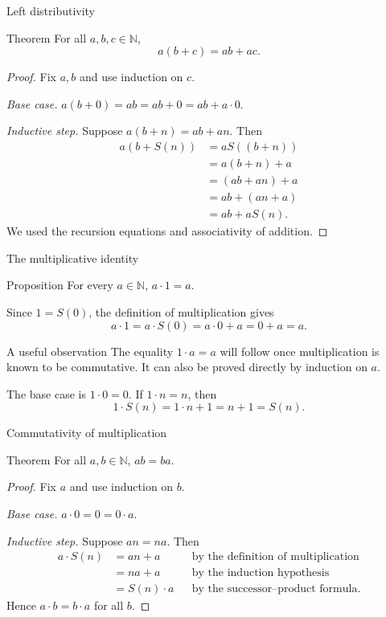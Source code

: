 \documentclass[aspectratio=169,11pt]{beamer}
\newcommand{\N}{\mathbb N}
\newcommand{\suc}[1]{S(#1)}
\begin{document}
\begin{frame}{Left distributivity}
  \footnotesize
  \begin{block}{Theorem}
    For all \(a,b,c\in\N\),
    \[
      a(b+c)=ab+ac.
    \]
  \end{block}

  \begin{proof}
    Fix \(a,b\) and use induction on \(c\).

    \emph{Base case.}
    \(a(b+0)=ab=ab+0=ab+a\cdot0\).

    \emph{Inductive step.} Suppose \(a(b+n)=ab+an\).  Then
    \begin{align*}
      a(b+\suc n)
        &=a\suc{(b+n)}\\
        &=a(b+n)+a\\
        &=(ab+an)+a\\
        &=ab+(an+a)\\
        &=ab+a\suc n.
    \end{align*}
    We used the recursion equations and associativity of addition.
  \end{proof}
\end{frame}

\begin{frame}{The multiplicative identity}
  \begin{block}{Proposition}
    For every \(a\in\N\), \(a\cdot1=a\).
  \end{block}

  Since \(1=\suc 0\), the definition of multiplication gives
  \[
    a\cdot1=a\cdot\suc 0=a\cdot0+a=0+a=a.
  \]

  \begin{block}{A useful observation}
    The equality \(1\cdot a=a\) will follow once multiplication is known to be
    commutative.  It can also be proved directly by induction on \(a\).

    The base case is \(1\cdot0=0\).  If \(1\cdot n=n\), then
    \[
      1\cdot\suc n=1\cdot n+1=n+1=\suc n.
    \]
  \end{block}
\end{frame}

\begin{frame}{Commutativity of multiplication}
  \begin{block}{Theorem}
    For all \(a,b\in\N\), \(ab=ba\).
  \end{block}

  \begin{proof}
    Fix \(a\) and use induction on \(b\).

    \emph{Base case.}
    \(a\cdot0=0=0\cdot a\).

    \emph{Inductive step.} Suppose \(an=na\).  Then
    \begin{align*}
      a\cdot\suc n
        &=an+a &&\text{by the definition of multiplication}\\
        &=na+a &&\text{by the induction hypothesis}\\
        &=\suc n\cdot a &&\text{by the successor--product formula}.
    \end{align*}
    Hence \(a\cdot b=b\cdot a\) for all \(b\).
  \end{proof}
\end{frame}
\end{document}
